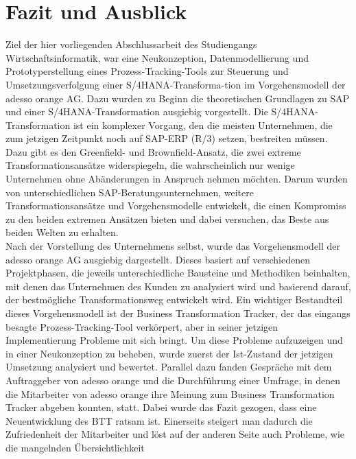 \section{Fazit und Ausblick}
Ziel der hier vorliegenden Abschlussarbeit des Studiengangs Wirtschaftsinformatik, war eine Neukonzeption, Datenmodellierung und Prototyperstellung eines Prozess-Tracking-Tools zur Steuerung und Umsetzungsverfolgung einer S/4HANA-Transforma-tion im Vorgehensmodell der adesso orange AG. Dazu wurden zu Beginn die theoretischen Grundlagen zu SAP und einer S/4HANA-Transformation ausgiebig vorgestellt. Die S/4HANA-Transformation ist ein komplexer Vorgang, den die meisten Unternehmen, die zum jetzigen Zeitpunkt noch auf SAP-ERP (R/3) setzen, bestreiten müssen. Dazu gibt es den Greenfield- und Brownfield-Ansatz, die zwei extreme Transformationsansätze widerspiegeln, die wahrscheinlich nur wenige Unternehmen ohne Abänderungen in Anspruch nehmen möchten. Darum wurden von unterschiedlichen SAP-Beratungsunternehmen, weitere Transformationsansätze und Vorgehensmodelle entwickelt, die einen Kompromiss zu den beiden extremen Ansätzen bieten und dabei versuchen, das \glqq{}Beste aus beiden Welten\grqq{} zu erhalten.\\Nach der Vorstellung des Unternehmens selbst, wurde das Vorgehensmodell der adesso orange AG ausgiebig dargestellt. Dieses basiert auf verschiedenen Projektphasen, die jeweils unterschiedliche Bausteine und Methodiken beinhalten, mit denen das Unternehmen des Kunden zu analysiert wird und basierend darauf, der bestmögliche Transformationsweg entwickelt wird. Ein wichtiger Bestandteil dieses Vorgehensmodell ist der Business Transformation Tracker, der das eingangs besagte Prozess-Tracking-Tool verkörpert, aber in seiner jetzigen Implementierung Probleme mit sich bringt. Um diese Probleme aufzuzeigen und in einer Neukonzeption zu beheben, wurde zuerst der Ist-Zustand der jetzigen Umsetzung analysiert und bewertet. Parallel dazu fanden Gespräche mit dem Auftraggeber von adesso orange und die Durchführung einer Umfrage, in denen die Mitarbeiter von adesso orange ihre Meinung zum Business Transformation Tracker abgeben konnten, statt. Dabei wurde das Fazit gezogen, dass eine Neuentwicklung des BTT ratsam ist. Einerseits steigert man dadurch die Zufriedenheit der Mitarbeiter und löst auf der anderen Seite auch Probleme, wie die mangelnden Übersichtlichkeit
